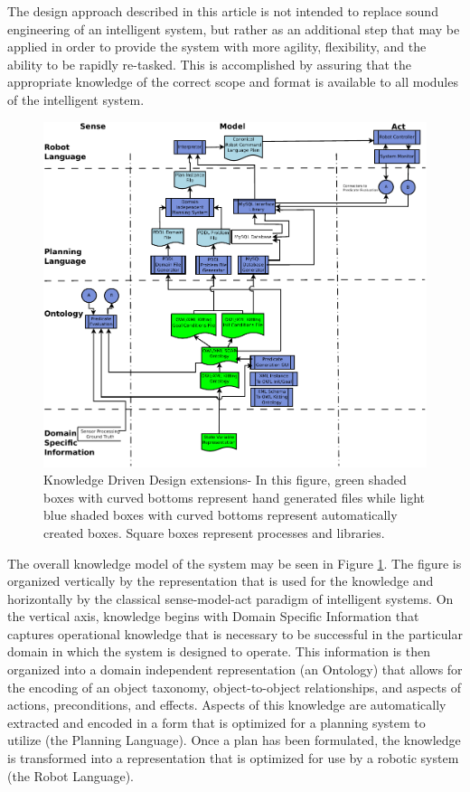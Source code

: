 The design approach described in this article is not intended to
replace sound engineering of an intelligent system, but rather as 
an additional step that may be applied in order to provide
the system with more agility, flexibility, and the ability to be rapidly
re-tasked. This is accomplished by assuring that the appropriate knowledge
of the correct scope and format is available to all modules of the
intelligent system.

\begin{figure}[ht!]
\begin{center}
\includegraphics[width=13cm]{images/KnowledgeDrivenRobotics.pdf}
\caption{Knowledge Driven Design extensions- In this figure, green shaded boxes with curved bottoms 
represent hand generated files while
light blue shaded boxes with curved bottoms represent automatically created boxes. Square
boxes represent processes and libraries.}
\label{fig:DesignArchitecture}
\end{center}
\end{figure}

The overall knowledge model of the system may be seen in Figure \ref{fig:DesignArchitecture}.
The figure is organized vertically by the representation that is used for the knowledge
and horizontally by the classical sense-model-act paradigm of intelligent systems.
On the vertical axis, knowledge begins with Domain Specific Information that captures
operational knowledge that is necessary to be successful in the particular domain in which
the system is designed to operate. This information is then organized into a domain
independent representation (an Ontology) that allows for the encoding of an object 
taxonomy, object-to-object
relationships, and aspects of actions, preconditions, and effects. 
Aspects of this
knowledge are automatically extracted and encoded in a form that is optimized for
a planning system to utilize (the Planning Language). Once a plan has been formulated, 
the knowledge is transformed into a representation that is optimized for use by a robotic system
(the Robot Language).

